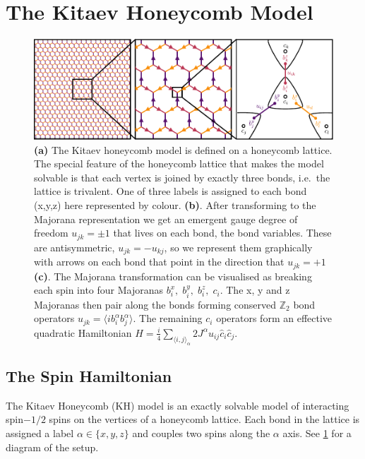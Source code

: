 \hypertarget{bg-hkm-model}{%
\section{The Kitaev Honeycomb Model}\label{bg-hkm-model}}

\hypertarget{fig:intro_figure_by_hand}{%
\begin{figure}
\centering
\includegraphics[width=1\textwidth,height=\textheight]{figure_code/amk_chapter/intro/honeycomb_zoom/intro_figure_by_hand}
\caption[{The Kitaev Honeycomb Model}]{\textbf{(a)} The Kitaev honeycomb model is defined on a honeycomb lattice. The special feature of the honeycomb lattice that makes the model solvable is that each vertex is joined by exactly three bonds, i.e.~the lattice is trivalent. One of three labels is assigned to each bond (x,y,z) here represented by colour. \textbf{(b)}. After transforming to the Majorana representation we get an emergent gauge degree of freedom \(u_{jk} = \pm 1\) that lives on each bond, the bond variables. These are antisymmetric, \(u_{jk} = -u_{kj}\), so we represent them graphically with arrows on each bond that point in the direction that \(u_{jk} = +1\) \textbf{(c)}. The Majorana transformation can be visualised as breaking each spin into four Majoranas \(b_i^x,\;b_i^y,\;b_i^z,\;c_i\). The x, y and z Majoranas then pair along the bonds forming conserved \(\mathbb{Z}_2\) bond operators \(u_{jk} = \langle i b_i^\alpha b_j^\alpha \rangle\). The remaining \(c_i\) operators form an effective quadratic Hamiltonian \(H = \frac{i}{4} \sum_{\langle i,j\rangle_\alpha} 2J^{\alpha} u_{ij} \hat{c}_i \hat{c}_j\).}
\label{fig:intro_figure_by_hand}
\end{figure}
}

\hypertarget{the-spin-hamiltonian}{%
\subsection{The Spin Hamiltonian}\label{the-spin-hamiltonian}}

The Kitaev Honeycomb (KH) model is an exactly solvable model of interacting spin\(-1/2\) spins on the vertices of a honeycomb lattice. Each bond in the lattice is assigned a label \(\alpha \in \{ x, y, z\}\) and couples two spins along the \(\alpha\) axis. See \cref{fig:intro_figure_by_hand} for a diagram of the setup.

